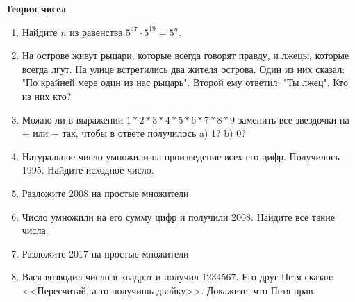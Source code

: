 \documentclass{article}
\begin{document}
\large
	
\begin{center}
	\textbf{Теория чисел}
\end{center}


\begin{enumerate}[label*=\protect\fbox{\arabic{enumi}}]
	
\item Найдите $n$ из равенства $5^{47} \cdot 5^{19} = 5^n$.

\item На острове живут рыцари, которые всегда говорят правду, и лжецы, которые всегда лгут. На улице встретились два жителя острова. Один из них сказал: "По крайней мере один из нас рыцарь". Второй ему ответил: "Ты лжец". Кто из них кто?

\item Можно ли в выражении $1 * 2 * 3*4*5*6*7*8*9$ заменить все звездочки на $+$ или $-$ так, чтобы в ответе получилось a) 1? b) 0?

\item Натуральное число умножили на произведение всех его цифр. Получилось 1995. Найдите исходное
число.

\item Разложите 2008 на простые множители

\item Число умножили на его сумму цифр и получили 2008. Найдите все такие числа.

\item Разложите 2017 на простые множители

\item Вася возводил число в квадрат и получил 1234567. Его друг Петя сказал: <<Пересчитай, а то получишь двойку>>. Докажите, что Петя прав.



\end{enumerate}
\end{document}

